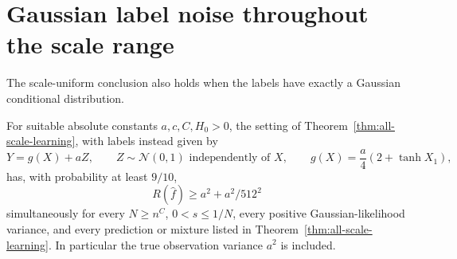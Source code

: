 \section{Gaussian label noise throughout the scale range}
\label{sec:all-scale-Gaussian-noise}
The scale-uniform conclusion also holds when the labels have exactly a Gaussian conditional distribution.

\begin{corollary}
\label{cor:all-scale-Gaussian-noise}
For suitable absolute constants $a,c,C,H_0>0$, the setting of Theorem~\ref{thm:all-scale-learning}, with labels instead given by
\[
 Y=g(X)+aZ,\qquad Z\sim\mathcal N(0,1)\text{ independently of }X,
 \qquad g(X)=\frac a4(2+\tanh X_1),
\]
has, with probability at least $9/10$,
\[
 R(\widehat f)\ge a^2+a^2/512^2
\]
simultaneously for every $N\ge n^C$, $0<s\le1/N$, every positive Gaussian-likelihood variance, and every prediction or mixture listed in Theorem~\ref{thm:all-scale-learning}. In particular the true observation variance $a^2$ is included.
\end{corollary}
